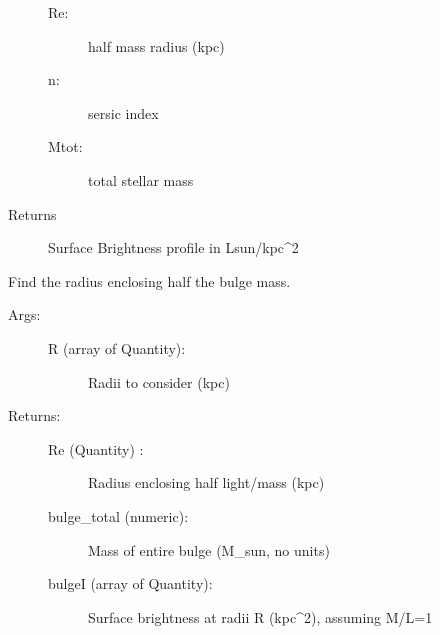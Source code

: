 \documentclass[letterpaper,10pt,english]{sphinxmanual}
\begin{document}
\begin{fulllineitems}
\begin{fulllineitems}
\begin{description}
\begin{description}
\item[{Re:}] \leavevmode
half mass radius (kpc)

\item[{n:}] \leavevmode
sersic index

\item[{Mtot:}] \leavevmode
total stellar mass

\end{description}

\item[{Returns}] \leavevmode
Surface Brightness profile in Lsun/kpc\textasciicircum{}2

\end{description}

\end{fulllineitems}


\begin{fulllineitems}
\label{\detokenize{massprofile:galaxy.massprofile.MassProfile.bulge_Re}}
Find the radius enclosing half the bulge mass.
\begin{description}
\item[{Args:}] \leavevmode\begin{description}
\item[{R (array of Quantity):}] \leavevmode
Radii to consider (kpc)

\end{description}

\item[{Returns:}] \leavevmode\begin{description}
\item[{Re (Quantity) :}] \leavevmode
Radius enclosing half light/mass (kpc)

\item[{bulge\_total (numeric):}] \leavevmode
Mass of entire bulge (M\_sun, no units)

\item[{bulgeI (array of Quantity):}] \leavevmode
Surface brightness at radii R (kpc\textasciicircum{}\sphinxhyphen{}2), assuming M/L=1

\end{description}

\end{description}

\end{fulllineitems}


\end{fulllineitems}
\end{document}
